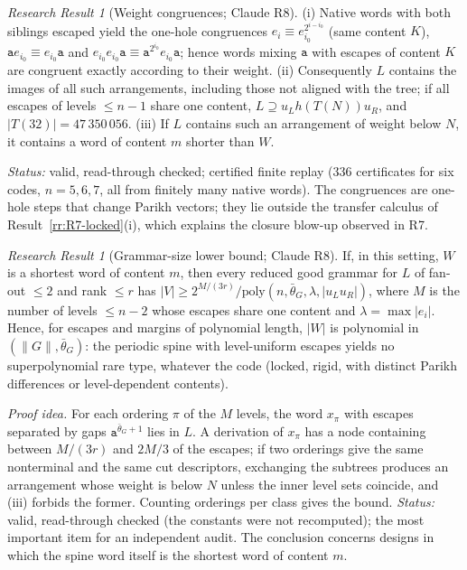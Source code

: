 \documentclass[11pt]{article}
\numberwithin{equation}{section}
\theoremstyle{plain}
\theoremstyle{definition}
\theoremstyle{remark}
\newtheorem{rresult}[theorem]{Research Result}
\theoremstyle{plain}
\begin{document}
\begin{rresult}[Weight congruences; Claude R8]
\label{rr:R8-weights}
(i) Native words with both siblings escaped yield the one-hole congruences
$e_i\equiv e_{i_0}^{2^{i-i_0}}$ (same content $K$), $\mathtt ae_{i_0}\equiv e_{i_0}\mathtt a$
and $e_{i_0}e_{i_0}\mathtt a\equiv\mathtt a^{2^{i_0}}e_{i_0}\mathtt a$; hence words mixing
$\mathtt a$ with escapes of content $K$ are congruent exactly according to their weight.
(ii) Consequently $L$ contains the images of all such arrangements, including those not
aligned with the tree; if all escapes of levels $\le n-1$ share one content, $L\supseteq
u_Lh(T(N))u_R$, and $|T(32)|=47\,350\,056$.  (iii) If $L$ contains such an arrangement of
weight below $N$, it contains a word of content $m$ shorter than $W$.
\end{rresult}
\noindent\emph{Status:} valid, read-through checked; certified finite replay ($336$
certificates for six codes, $n=5,6,7$, all from finitely many native words).  The
congruences are one-hole steps that change Parikh vectors; they lie outside the transfer
calculus of Result~\ref{rr:R7-locked}(i), which explains the closure blow-up observed in R7.

\begin{rresult}[Grammar-size lower bound; Claude R8]
\label{rr:R8-lower-bound}
If, in this setting, $W$ is a shortest word of content $m$, then every reduced good grammar
for $L$ of fan-out $\le2$ and rank $\le r$ has
$|V|\ge2^{M/(3r)}/\mathrm{poly}(n,\bar\theta_G,\lambda,|u_Lu_R|)$, where $M$ is the number of
levels $\le n-2$ whose escapes share one content and $\lambda=\max|e_i|$.  Hence, for escapes
and margins of polynomial length, $|W|$ is polynomial in $(\|G\|,\bar\theta_G)$: the
periodic spine with level-uniform escapes yields no superpolynomial rare type, whatever the
code (locked, rigid, with distinct Parikh differences or level-dependent contents).
\end{rresult}
\noindent\emph{Proof idea.} For each ordering $\pi$ of the $M$ levels, the word
$x_\pi$ with escapes separated by gaps $\mathtt a^{\bar\theta_G+1}$ lies in $L$.  A derivation
of $x_\pi$ has a node containing between $M/(3r)$ and $2M/3$ of the escapes; if two orderings
give the same nonterminal and the same cut descriptors, exchanging the subtrees produces an
arrangement whose weight is below $N$ unless the inner level sets coincide, and
(iii) forbids the former.  Counting orderings per class gives the bound.
\emph{Status:} valid, read-through checked (the constants were not recomputed); the most
important item for an independent audit.  The conclusion concerns designs in which the spine
word itself is the shortest word of content $m$.
\end{document}
